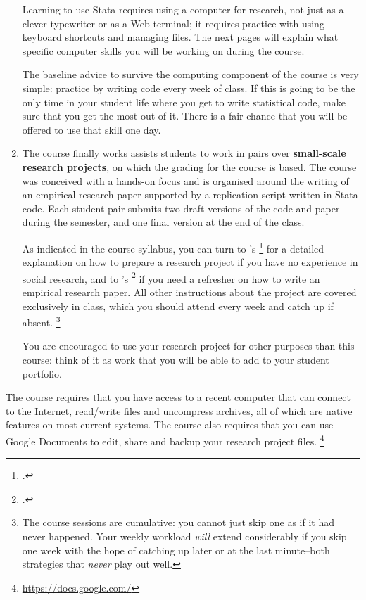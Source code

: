 \begin{enumerate}
		Learning to use Stata requires using a computer for research, not just as a clever typewriter or as a Web terminal; it requires practice with using keyboard shortcuts and managing files. The next pages will explain what specific computer skills you will be working on during the course.%
		
		The baseline advice to survive the computing component of the course is very simple: practice by writing code every week of class. If this is going to be the only time in your student life where you get to write statistical code, make sure that you get the most out of it. There is a fair chance that you will be offered to use that skill one day.%


  \item The course finally works assists students to work in pairs over \textbf{small-scale research projects}, on which the grading for the course is based. %
		The course was conceived with a hands-on focus and is organised around the  writing of an empirical research paper supported by a replication script written in Stata code. Each student pair submits two draft versions of the code and paper during the semester, and one final version at the end of the class.%
		
		As indicated in the course syllabus, you can turn to \citeauthor{BoothWilliams:2003v}'s \footcite{BoothWilliams:2003v} for a detailed explanation on how to prepare a research project if you have no experience in social research, and to \citeauthor{White:2005a}'s \footcite{White:2005a} if you need a refresher on how to write an empirical research paper. All other instructions about the project are covered exclusively in class, which you should attend every week and catch up if absent.%
		\footnote{The course sessions are cumulative: you cannot just skip one as if it had never happened. Your weekly workload \emph{will} extend considerably if you skip one week with the hope of catching up later or at the last minute–both strategies that \emph{never} play out well.}%
		
		You are encouraged to use your research project for other purposes than this course: think of it as work that you will be able to add to your student portfolio.%

\end{enumerate}

	The course requires that you have access to a recent computer that can connect to the Internet, read/write \PDF files and uncompress \ZIP archives, all of which are native features on most current systems. The course also requires that you can use Google Documents to edit, share and backup your research project files.%
	\footnote{\url{https://docs.google.com/}}%


